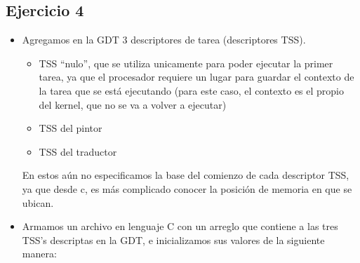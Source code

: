 \subsection{Ejercicio 4}
\begin{itemize}
 \item Agregamos en la GDT 3 descriptores de tarea (descriptores TSS).
	\begin{itemize}
 		\item TSS ``nulo'', que se utiliza unicamente para poder ejecutar la primer tarea, ya que el procesador requiere un lugar para guardar el contexto de la tarea que se est\'a ejecutando (para este caso, el contexto es el propio del kernel, que no se va a volver a ejecutar)
		\item TSS del pintor
		\item TSS del traductor
	\end{itemize}
	En estos a\'un no especificamos la base del comienzo de cada descriptor TSS, ya que desde c, es m\'as complicado conocer la posici\'on de memoria en que se ubican.

 \item Armamos un archivo en lenguaje C con un arreglo que contiene a las tres TSS's descriptas en la GDT, e inicializamos sus valores de la siguiente manera:
	\begin{itemize}
 	

\end{itemize}
\end{itemize}
